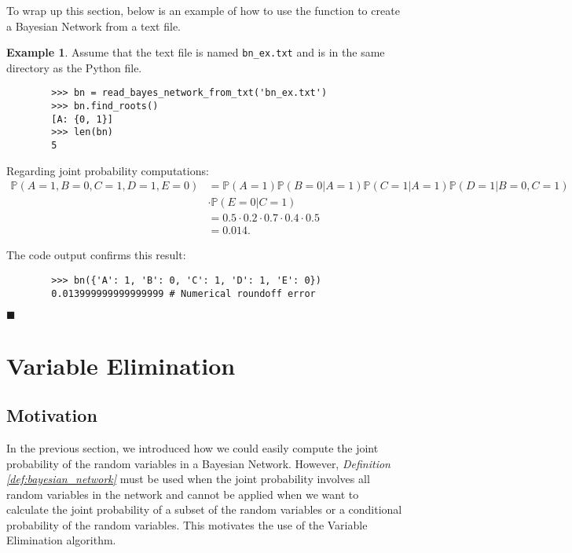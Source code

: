 \documentclass{article}
\theoremstyle{definition}
\newtheorem{example}{Example}
\newenvironment{exampleqed}
    {\begin{example}}
    {\hfill \qedsymbol \end{example}}
\renewcommand{\qedsymbol}{\(\blacksquare\)}
\renewcommand{\P}{\mathbb{P}}
\begin{document}
To wrap up this section, below is an example of how to use the function to create a Bayesian Network from a text file.

\begin{exampleqed}
    Assume that the text file is named \texttt{\texttt{bn\_ex.txt}} and is in the same directory as the Python file.

    \begin{verbatim}
        >>> bn = read_bayes_network_from_txt('bn_ex.txt')
        >>> bn.find_roots()
        [A: {0, 1}]
        >>> len(bn)
        5
    \end{verbatim}

    Regarding joint probability computations:
    \begin{align*}
        \P(A=1, B=0, C=1, D=1, E=0) &= \P(A=1)\P(B=0|A=1)\P(C=1|A=1)\P(D=1|B=0,C=1) \\
        &\cdot \P(E=0|C=1) \\
        &= 0.5 \cdot 0.2 \cdot 0.7 \cdot 0.4 \cdot 0.5 \\
        &= 0.014.
    \end{align*}

    The code output confirms this result:

    \begin{verbatim}
        >>> bn({'A': 1, 'B': 0, 'C': 1, 'D': 1, 'E': 0})
        0.013999999999999999 # Numerical roundoff error
    \end{verbatim}
\end{exampleqed}

\pagebreak

\section{Variable Elimination}

\subsection{Motivation}

In the previous section, we introduced how we could easily compute the joint probability of the random variables in a Bayesian Network. However, \textit{Definition \ref{def:bayesian_network}} must be used when the joint probability involves all random variables in the network and cannot be applied when we want to calculate the joint probability of a subset of the random variables or a conditional probability of the random variables. This motivates the use of the Variable Elimination algorithm.
\end{document}
